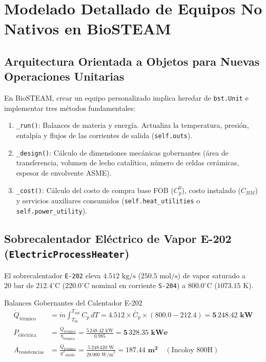 \documentclass[11pt,letterpaper]{article}
\begin{document}
\newpage

\section{Modelado Detallado de Equipos No Nativos en BioSTEAM}

\subsection{Arquitectura Orientada a Objetos para Nuevas Operaciones Unitarias}
En BioSTEAM, crear un equipo personalizado implica heredar de \texttt{bst.Unit} e implementar tres métodos fundamentales:
\begin{enumerate}
    \item \texttt{\_run()}: Balances de materia y energía. Actualiza la temperatura, presión, entalpía y flujos de las corrientes de salida (\texttt{self.outs}).
    \item \texttt{\_design()}: Cálculo de dimensiones mecánicas gobernantes (área de transferencia, volumen de lecho catalítico, número de celdas cerámicas, espesor de envolvente ASME).
    \item \texttt{\_cost()}: Cálculo del costo de compra base FOB ($C_p^0$), costo instalado ($C_{BM}$) y servicios auxiliares consumidos (\texttt{self.heat\_utilities} o \texttt{self.power\_utility}).
\end{enumerate}

\subsection{Sobrecalentador Eléctrico de Vapor E-202 (\texttt{ElectricProcessHeater})}
El sobrecalentador \texttt{E-202} eleva $4.512\text{ kg/s}$ ($250.5\text{ mol/s}$) de vapor saturado a $20\text{ bar}$ de $212.4^\circ\text{C}$ ($220.0^\circ\text{C}$ nominal en corriente \texttt{S-204}) a $800.0^\circ\text{C}$ ($1073.15\text{ K}$).

\begin{equationbox}{Balances Gobernantes del Calentador E-202}
\begin{align}
    \dot{Q}_{\text{térmico}} &= \dot{m} \int_{T_{\text{in}}}^{T_{\text{out}}} C_p\,dT = 4.512 \times \bar{C}_p \times (800.0 - 212.4) = \mathbf{5\,248.42\text{ kW}} \\
    P_{\text{eléctrica}} &= \frac{\dot{Q}_{\text{térmico}}}{\eta_{\text{térmica}}} = \frac{5\,248.42\text{ kW}}{0.985} = \mathbf{5\,328.35\text{ kWe}} \\
    A_{\text{resistencias}} &= \frac{\dot{Q}_{\text{térmico}}}{q''_{\text{diseño}}} = \frac{5\,248\,420\text{ W}}{28\,000\text{ W/m}^2} = \mathbf{187.44\text{ m}^2} \quad (\text{Incoloy 800H})
\end{align}
\end{equationbox}
\end{document}
